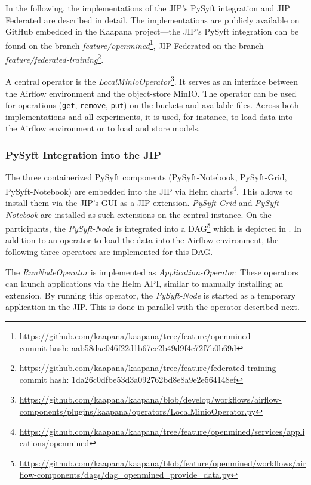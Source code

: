 In the following, the implementations of the JIP's PySyft integration and JIP Federated are described in detail.
The implementations are publicly available on GitHub embedded in the Kaapana project---the JIP's PySyft integration can be found on the branch \textit{feature/openmined}\footnote{\url{https://github.com/kaapana/kaapana/tree/feature/openmined}\\ commit hash: aab58dac046f22d1b67ee2b49d9f4c72f7b0b69d}, JIP Federated on the branch \textit{feature/federated-training}\footnote{\url{https://github.com/kaapana/kaapana/tree/feature/federated-training}\\ commit hash: 1da26c0dfbe53d3a092762bd8e8a9e2e564148ef}.

A central operator is the \textit{LocalMinioOperator}\footnote{\url{https://github.com/kaapana/kaapana/blob/develop/workflows/airflow-components/plugins/kaapana/operators/LocalMinioOperator.py}}. It serves as an interface between the Airflow environment and the object-store MinIO. The operator can be used for operations (\verb|get|, \verb|remove|, \verb|put|)  on the buckets and available files. Across both implementations and all experiments, it is used, for instance, to load data into the Airflow environment or to load and store models.

\subsubsection{PySyft Integration into the JIP}

The three containerized PySyft components (PySyft-Notebook, PySyft-Grid, PySyft-Notebook) are embedded into the JIP via Helm charts\footnote{\url{https://github.com/kaapana/kaapana/tree/feature/openmined/services/applications/openmined}}. This allows to install them via the JIP's GUI as a JIP extension. \textit{PySyft-Grid} and \textit{PySyft-Notebook} are installed as such extensions on the central instance.
On the participants, the \textit{PySyft-Node} is integrated into a DAG\footnote{\url{https://github.com/kaapana/kaapana/blob/feature/openmined/workflows/airflow-components/dags/dag_openmined_provide_data.py}} which is depicted in . In addition to an operator to load the data into the Airflow environment, the following three operators are implemented for this DAG.

The \textit{RunNodeOperator} is implemented as \textit{Application-Operator}. These operators can launch applications via the Helm API, similar to manually installing an extension. By running this operator, the \textit{PySyft-Node} is started as a temporary application in the JIP. This is done in parallel with the operator described next.

